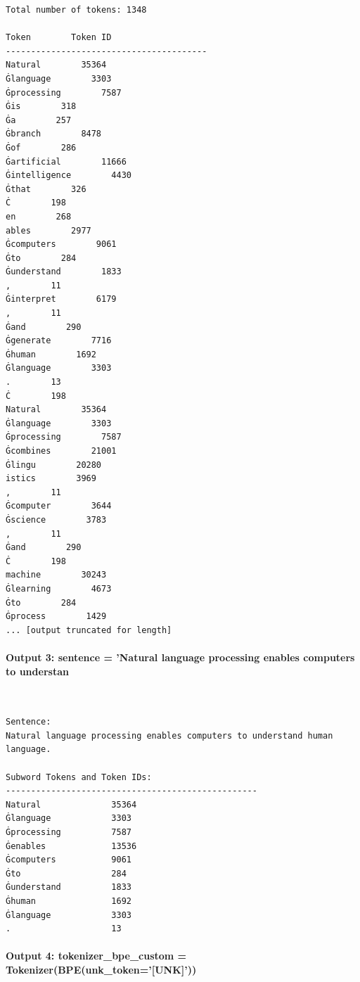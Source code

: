 \documentclass[12pt,a4paper,oneside]{report}
\begin{document}
\begin{Verbatim}[commandchars=\\\{\},breaklines=true,breakanywhere=true,fontsize=\scriptsize,frame=leftline,framesep=2mm,rulecolor=\color{gray}]
Total number of tokens: 1348

Token        Token ID
----------------------------------------
Natural        35364
Ġlanguage        3303
Ġprocessing        7587
Ġis        318
Ġa        257
Ġbranch        8478
Ġof        286
Ġartificial        11666
Ġintelligence        4430
Ġthat        326
Ċ        198
en        268
ables        2977
Ġcomputers        9061
Ġto        284
Ġunderstand        1833
,        11
Ġinterpret        6179
,        11
Ġand        290
Ġgenerate        7716
Ġhuman        1692
Ġlanguage        3303
.        13
Ċ        198
Natural        35364
Ġlanguage        3303
Ġprocessing        7587
Ġcombines        21001
Ġlingu        20280
istics        3969
,        11
Ġcomputer        3644
Ġscience        3783
,        11
Ġand        290
Ċ        198
machine        30243
Ġlearning        4673
Ġto        284
Ġprocess        1429
... [output truncated for length]
\end{Verbatim}
\paragraph{Output 3: sentence = 'Natural language processing enables computers to understan}\mbox{}\\[-1ex]
\begin{Verbatim}[commandchars=\\\{\},breaklines=true,breakanywhere=true,fontsize=\scriptsize,frame=leftline,framesep=2mm,rulecolor=\color{gray}]
Sentence:
Natural language processing enables computers to understand human language.

Subword Tokens and Token IDs:
--------------------------------------------------
Natural              35364
Ġlanguage            3303
Ġprocessing          7587
Ġenables             13536
Ġcomputers           9061
Ġto                  284
Ġunderstand          1833
Ġhuman               1692
Ġlanguage            3303
.                    13
\end{Verbatim}
\paragraph{Output 4: tokenizer\_bpe\_custom = Tokenizer(BPE(unk\_token='[UNK]'))}\mbox{}\\[-1ex]
\end{document}
